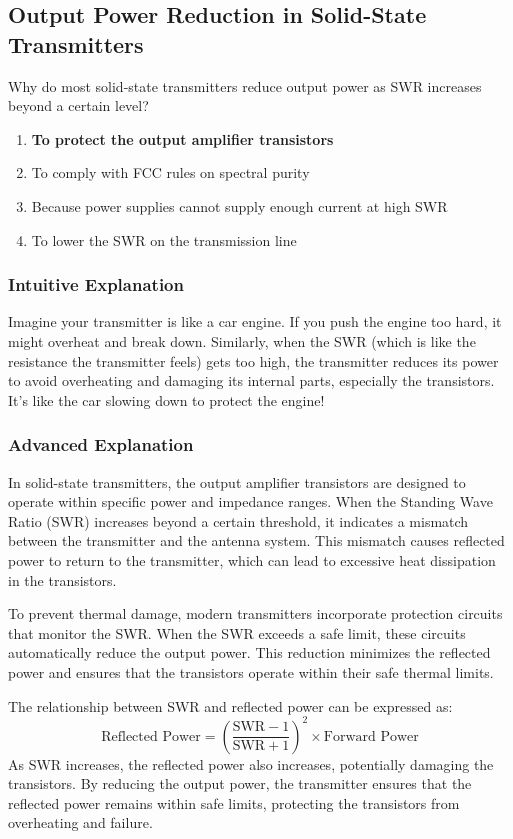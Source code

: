 \subsection{Output Power Reduction in Solid-State Transmitters}
\label{T7C05}

\begin{tcolorbox}[colback=gray!10!white,colframe=black!75!black,title=T7C05]
Why do most solid-state transmitters reduce output power as SWR increases beyond a certain level?
\begin{enumerate}[label=\Alph*)]
    \item \textbf{To protect the output amplifier transistors}
    \item To comply with FCC rules on spectral purity
    \item Because power supplies cannot supply enough current at high SWR
    \item To lower the SWR on the transmission line
\end{enumerate}
\end{tcolorbox}

\subsubsection{Intuitive Explanation}
Imagine your transmitter is like a car engine. If you push the engine too hard, it might overheat and break down. Similarly, when the SWR (which is like the resistance the transmitter feels) gets too high, the transmitter reduces its power to avoid overheating and damaging its internal parts, especially the transistors. It’s like the car slowing down to protect the engine!

\subsubsection{Advanced Explanation}
In solid-state transmitters, the output amplifier transistors are designed to operate within specific power and impedance ranges. When the Standing Wave Ratio (SWR) increases beyond a certain threshold, it indicates a mismatch between the transmitter and the antenna system. This mismatch causes reflected power to return to the transmitter, which can lead to excessive heat dissipation in the transistors. 

To prevent thermal damage, modern transmitters incorporate protection circuits that monitor the SWR. When the SWR exceeds a safe limit, these circuits automatically reduce the output power. This reduction minimizes the reflected power and ensures that the transistors operate within their safe thermal limits. 

The relationship between SWR and reflected power can be expressed as:
\[
\text{Reflected Power} = \left( \frac{\text{SWR} - 1}{\text{SWR} + 1} \right)^2 \times \text{Forward Power}
\]
As SWR increases, the reflected power also increases, potentially damaging the transistors. By reducing the output power, the transmitter ensures that the reflected power remains within safe limits, protecting the transistors from overheating and failure.


